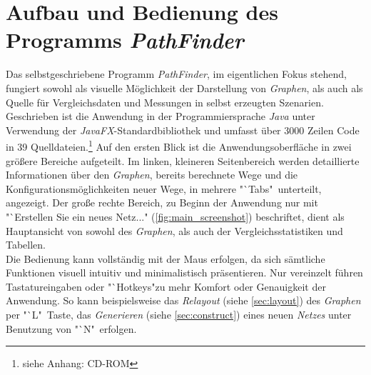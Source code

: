 \documentclass[12pt]{article}
\begin{document}
\section{Aufbau und Bedienung des Programms \textit{PathFinder}}
\label{sec:manual}
Das selbstgeschriebene Programm \textit{PathFinder}, im eigentlichen Fokus stehend, fungiert sowohl als visuelle Möglichkeit der Darstellung von \textit{Graphen}, als auch als Quelle für Vergleichsdaten und Messungen in selbst erzeugten Szenarien. Geschrieben ist die Anwendung in der Programmiersprache \textit{Java} unter Verwendung der \textit{JavaFX}-Standardbibliothek \cite{javafx} und umfasst über 3000 Zeilen Code in 39 Quelldateien.\footnote{siehe Anhang: CD-ROM}
Auf den ersten Blick ist die Anwendungsoberfläche in zwei größere Bereiche aufgeteilt. Im linken, kleineren Seitenbereich werden detaillierte Informationen über den \textit{Graphen}, bereits berechnete Wege und die Konfigurationsmöglichkeiten neuer Wege, in mehrere "`Tabs"\ unterteilt, angezeigt. Der große rechte Bereich, zu Beginn der Anwendung nur mit "`Erstellen Sie ein neues Netz..." (\autoref{fig:main_screenshot}) beschriftet, dient als Hauptansicht von sowohl des \textit{Graphen}, als auch der Vergleichsstatistiken und Tabellen.
\\
Die Bedienung kann vollständig mit der Maus erfolgen, da sich sämtliche Funktionen visuell intuitiv und minimalistisch präsentieren. Nur vereinzelt führen Tastatureingaben oder "`Hotkeys"\;zu mehr Komfort oder Genauigkeit der Anwendung. So kann beispielsweise das \textit{Relayout} (siehe \autoref{sec:layout}) des \textit{Graphen} per "`L"\ Taste, das \textit{Generieren} (siehe \autoref{sec:construct}) eines neuen \textit{Netzes} unter Benutzung von "`N"\ erfolgen.
\end{document}
